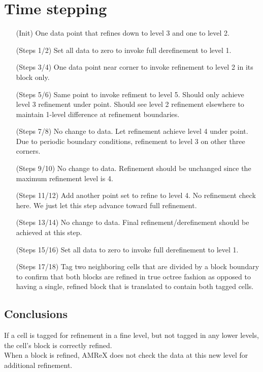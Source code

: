 \documentclass[12pt,letterpaper]{article}
\begin{document}
\section{Time stepping}
\begin{enumerate}
\item[(Init)]{One data point that refines down to level 3 and one to level 2.}
\item[(Steps 1/2)]{Set all data to zero to invoke full derefinement to level 1.}
\item[(Steps 3/4)]{One data point near corner to invoke refinement to level 2 in
its block only.}
\item[(Steps 5/6)]{Same point to invoke refiment to level 5.  Should only achieve
level 3 refinement under point.  Should see level 2 
refinement elsewhere to maintain 1-level difference at refinement boundaries.}
\item[(Steps 7/8)]{No change to data.  Let refinement achieve level 4 under
point.  Due to periodic boundary conditions, refinement to level 3 on other
three corners.}
\item[(Steps 9/10)]{No change to data.  Refinement should be unchanged since
the maximum refinement level is 4.}
\item[(Steps 11/12)]{Add another point set to refine to level 4.  No refinement check
here.  We just let this step advance toward full refinement.}
\item[(Steps 13/14)]{No change to data.  Final refinement/derefinement should be
achieved at this step.}
\item[(Steps 15/16)]{Set all data to zero to invoke full derefinement to level 1.}
\item[(Steps 17/18)]{Tag two neighboring cells that are divided by a block
boundary to confirm that both blocks are refined in true octree fashion as
opposed to having a single, refined block that is translated to contain both
tagged cells.}
\end{enumerate}

\subsection{Conclusions}
If a cell is tagged for refinement in a fine level, but not tagged in any lower
levels, the cell's block is correctly refined.\\

When a block is refined, AMReX does not check the data at this new level for
additional refinement.
\end{document}

